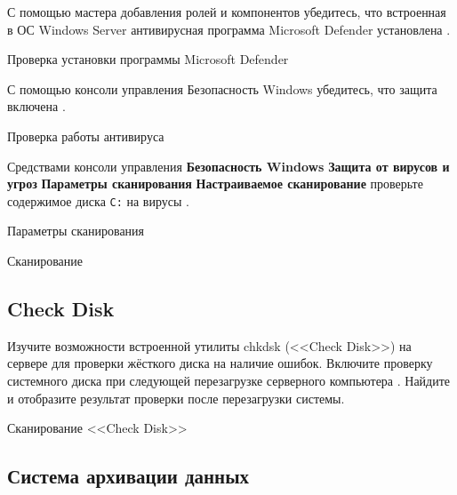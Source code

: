 С помощью мастера добавления ролей и компонентов убедитесь,
что встроенная в ОС Windows Server
антивирусная программа Microsoft Defender установлена
.

\begin{image}
	\caption{Проверка установки программы Microsoft Defender}
	\label{fig:antivir:components}
\end{image}

С помощью консоли управления Безопасность Windows убедитесь,
что защита включена .

\begin{image}
	\caption{Проверка работы антивируса}
	\label{fig:antivir:on}
\end{image}

Средствами консоли управления \textbf{Безопасность Windows}
\rarrow \textbf{Защита от вирусов и угроз}
\rarrow \textbf{Параметры сканирования}
\rarrow \textbf{Настраиваемое сканирование} проверьте содержимое
диска \texttt{С:} на вирусы .

\begin{image}
	\caption{Параметры сканирования}
	\label{fig:antivir:scan:prop}
\end{image}

\begin{image}
	\caption{Сканирование}
	\label{fig:antivir:scan}
\end{image}

\subsection{Check Disk}

Изучите возможности встроенной утилиты chkdsk (<<Check Disk>>)
на сервере для проверки жёсткого диска на наличие ошибок.
Включите проверку системного диска
при следующей перезагрузке серверного компьютера .
Найдите и отобразите результат проверки после перезагрузки системы.

\begin{image}
	\caption{Сканирование <<Check Disk>>}
	\label{fig:chkdsk:scan}
\end{image}

\subsection{Система архивации данных}

